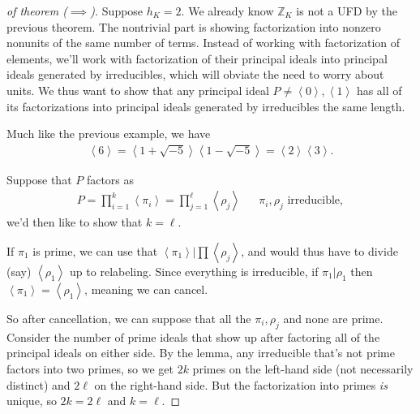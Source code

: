 \begin{proof}[of theorem ($\implies$)]

Suppose \(h_K = 2\). We already know \({\mathbb{Z}}_K\) is not a UFD by
the previous theorem. The nontrivial part is showing factorization into
nonzero nonunits of the same number of terms. Instead of working with
factorization of elements, we'll work with factorization of their
principal ideals into principal ideals generated by irreducibles, which
will obviate the need to worry about units. We thus want to show that
any principal ideal
\(P \neq \left\langle{ 0 }\right\rangle, \left\langle{ 1 }\right\rangle\)
has all of its factorizations into principal ideals generated by
irreducibles the same length.

\begin{example}[?]

Much like the previous example, we have
\begin{align*}
\left\langle{ 6 }\right\rangle = \left\langle{ 1 + \sqrt{-5} }\right\rangle \left\langle{ 1 - \sqrt{-5} }\right\rangle = \left\langle{ 2 }\right\rangle \left\langle{ 3 }\right\rangle     
.\end{align*}

\end{example}

Suppose that \(P\) factors as
\begin{align*}
P = 
\prod_{i=1}^k \left\langle{ \pi_i }\right\rangle
=
\prod_{j=1}^\ell \left\langle{ \rho_j }\right\rangle
&&
\pi_i, \rho_j \text{ irreducible}
,\end{align*}
we'd then like to show that \(k=\ell\).

\begin{observation}

If \(\pi_1\) is prime, we can use that
\(\left\langle{ \pi_1 }\right\rangle\mathrel{\Big|}\prod \left\langle{ \rho_j }\right\rangle\),
and would thus have to divide (say)
\(\left\langle{ \rho_1 }\right\rangle\) up to relabeling. Since
everything is irreducible, if \(\pi_1 \mathrel{\Big|}\rho_1\) then
\(\left\langle{ \pi_1 }\right\rangle= \left\langle{ \rho_1 }\right\rangle\),
meaning we can cancel.

\end{observation}

So after cancellation, we can suppose that all the \(\pi_i, \rho_j\) and
none are prime. Consider the number of prime ideals that show up after
factoring all of the principal ideals on either side. By the lemma, any
irreducible that's not prime factors into two primes, so we get \(2k\)
primes on the left-hand side (not necessarily distinct) and \(2\ell\) on
the right-hand side. But the factorization into primes \emph{is} unique,
so \(2k=2\ell\) and \(k=\ell\).

\end{proof}

